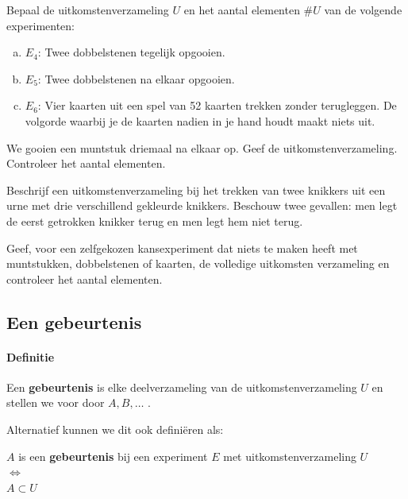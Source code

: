 \documentclass[12pt,twoside]{article}
\begin{document}
\begin{oefening}
Bepaal de uitkomstenverzameling $U$ en het aantal elementen $\#U$ van de volgende experimenten:
\begin{enumerate}[(a)]
  \item $E_4$: Twee dobbelstenen tegelijk opgooien.
  \item $E_5$: Twee dobbelstenen na elkaar opgooien.
  \item $E_6$: Vier kaarten uit een spel van 52 kaarten trekken zonder terugleggen. De volgorde waarbij je de kaarten nadien in je hand houdt maakt niets uit.
\end{enumerate}
\end{oefening}

\begin{oefening}
We gooien een muntstuk driemaal na elkaar op. Geef de uitkomstenverzameling. Controleer het aantal elementen.
\end{oefening}

\begin{oefening}
Beschrijf een uitkomstenverzameling bij het trekken van twee knikkers uit een urne met drie verschillend gekleurde knikkers. Beschouw twee gevallen: men legt de eerst getrokken knikker terug en men legt hem niet terug.
\end{oefening}

\begin{oefening}
Geef, voor een zelfgekozen kansexperiment dat niets te maken heeft met muntstukken, dobbelstenen of kaarten, de volledige uitkomsten verzameling en controleer het aantal elementen.
\end{oefening}

\subsection{Een gebeurtenis}

\paragraph*{Definitie} Een {\bf gebeurtenis} is elke deelverzameling van de uitkomstenverzameling $U$ en stellen
we voor door $A, B, \ldots$ .

Alternatief kunnen we dit ook definiëren als:\\
\begin{mdframed}
\begin{center}
$A$ is een {\bf gebeurtenis} bij een experiment $E$ met uitkomstenverzameling $U$\\
$\Leftrightarrow$\\
$A\subset U$
\end{center}
\end{mdframed}
\end{document}
